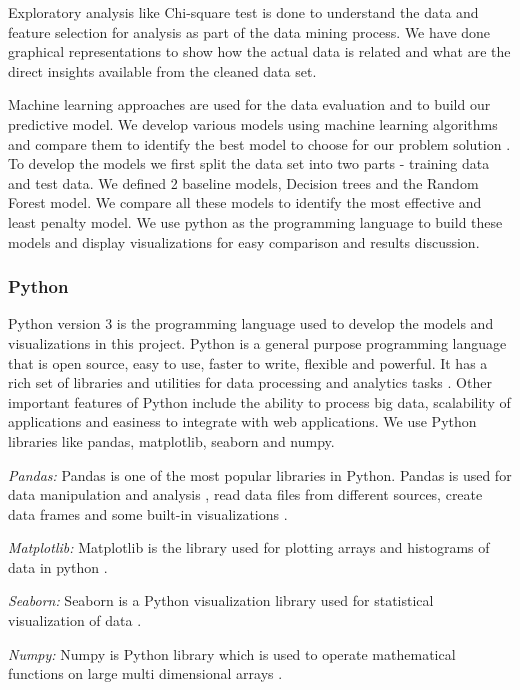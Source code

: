 \documentclass[sigconf]{acmart}
\begin{document}
Exploratory analysis like Chi-square test is done to understand the data and feature selection for analysis as part of the data mining process. We have done graphical representations to show how the actual data is related and what are the direct insights available from the cleaned data set.

Machine learning approaches are used for the data evaluation and to build our predictive model. We develop various models using machine learning algorithms and compare them to identify the best model to choose for our problem solution \cite{sas-machine-learning}. To develop the models we first split the data set into two parts - training data and test data. We defined 2 baseline models, Decision trees and the Random Forest model.  We compare all these models to identify the most effective and least penalty model. We use python as the programming language to build these models and display visualizations for easy comparison and results discussion.

\subsubsection{Python}

Python version 3 is the programming language used to develop the models and visualizations in this project. Python is a general purpose programming language that is open source, easy to use, faster to write, flexible and powerful. It has a rich set of libraries and utilities for data processing and analytics tasks \cite{python-important-big-data-analytics-applications}. Other important features of Python include the ability to process big data, scalability of applications and easiness to integrate with web applications. 
We use Python libraries like pandas, matplotlib, seaborn and numpy.

\textit{Pandas:} Pandas is one of the most popular libraries in Python. Pandas is used for data manipulation and analysis \cite{pandas}, read data files from different sources, create data frames and some built-in visualizations \cite{dataconomy-python}.

\textit{Matplotlib:} Matplotlib is the library used for plotting arrays and histograms of data in python \cite{Matplotlib}.

\textit{Seaborn:} Seaborn is a Python visualization library used for statistical visualization of data \cite{seaborn}.

\textit{Numpy:} Numpy is Python library which is used to operate mathematical functions on large multi dimensional arrays \cite{numpy}. 
\end{document}
